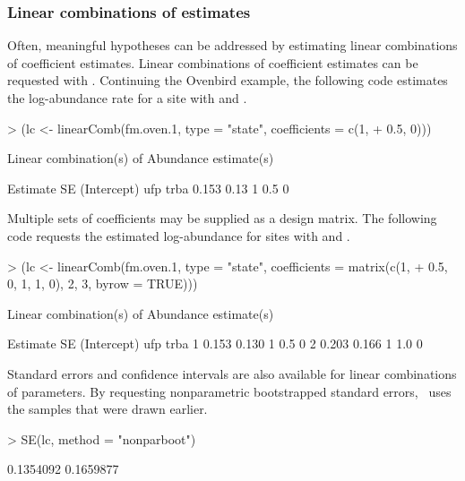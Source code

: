 \documentclass[article,shortnames]{jss}
\newcommand{\um}{\pkg{unmarked}}
\begin{document}
{\subsubsection{Linear combinations of estimates}

Often, meaningful hypotheses can be addressed by estimating linear
combinations of coefficient estimates.  Linear combinations of coefficient
estimates can be requested with . Continuing the Ovenbird
example, the following code estimates the log-abundance rate for a site with
 and .

\begin{Schunk}
\begin{Sinput}
> (lc <- linearComb(fm.oven.1, type = "state", coefficients = c(1, 
+     0.5, 0)))
\end{Sinput}
\begin{Soutput}
Linear combination(s) of Abundance estimate(s)

 Estimate   SE (Intercept) ufp trba
    0.153 0.13           1 0.5    0
\end{Soutput}
\end{Schunk}

Multiple sets of coefficients may be supplied as a design matrix.  The
following code requests the estimated log-abundance for sites with
 and .

\begin{Schunk}
\begin{Sinput}
> (lc <- linearComb(fm.oven.1, type = "state", coefficients = matrix(c(1, 
+     0.5, 0, 1, 1, 0), 2, 3, byrow = TRUE)))
\end{Sinput}
\begin{Soutput}
Linear combination(s) of Abundance estimate(s)

  Estimate    SE (Intercept) ufp trba
1    0.153 0.130           1 0.5    0
2    0.203 0.166           1 1.0    0
\end{Soutput}
\end{Schunk}

Standard errors and confidence intervals are also available for linear
combinations of parameters.  By requesting nonparametric bootstrapped
standard errors, \um\ uses the samples that were drawn earlier.

\begin{Schunk}
\begin{Sinput}
> SE(lc, method = "nonparboot")
\end{Sinput}
\begin{Soutput}
[1] 0.1354092 0.1659877
\end{Soutput}
\end{Schunk}

}
\end{document}
